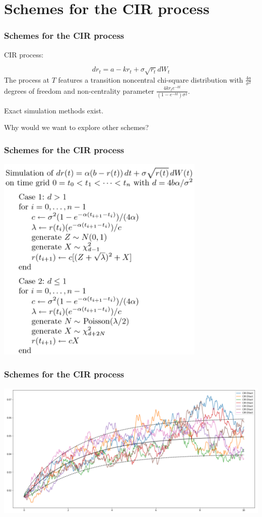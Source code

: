 \documentclass[12pt]{beamer}
\begin{document}
\section{Schemes for the CIR process}
\frame{\tableofcontents[currentsection]}

\begin{frame}
\frametitle{Schemes for the CIR process}
\centerline{CIR process:}
$$
	dr_{t}  = a - kr_{t} + \sigma \sqrt{r_{t}} dW_{t} 
$$
The process at $T$ features a transition noncentral chi-square distribution with $\frac{4a}{\sigma^2}$ degrees of freedom and non-centrality parameter $\frac{4kr_te^{-kt}}{(1 - e^{-kt})\sigma^2}$.
\vspace{0.5cm}

Exact simulation methods exist.
\vspace{0.5cm}

Why would we want to explore other schemes?
\end{frame}

\begin{frame}
\frametitle{Schemes for the CIR process}
\centering
\includegraphics[width=0.75\textwidth]{exact_scheme.png}
\end{frame}

\begin{frame}
\frametitle{Schemes for the CIR process}
\centering
\includegraphics[width=\textwidth]{paths_exact.png}
\end{frame}
\end{document}
